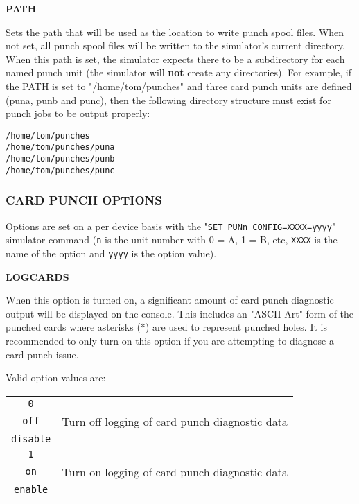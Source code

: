 \textbf{PATH}

\begin{adjustwidth}{5ex}{1ex}
    Sets the path that will be used as the location to write punch spool files. When not set, all punch spool files will be written
    to the simulator's current directory. When this path is set, the simulator expects there to be a subdirectory for each named punch 
    unit (the simulator will \textbf{not} create any directories).  For example, if the PATH is set to "/home/tom/punches" and three
    card punch units are defined (puna, punb and punc), then the following directory structure must exist for punch jobs to be output properly:

    \begin{adjustwidth}{5ex}{1ex}
        \texttt{/home/tom/punches} \\
        \texttt{/home/tom/punches/puna} \\
        \texttt{/home/tom/punches/punb} \\
        \texttt{/home/tom/punches/punc} \\
    \end{adjustwidth}
\end{adjustwidth}

\subsubsection[Card Punch Options]{CARD PUNCH OPTIONS}

Options are set on a per device basis with the "\texttt{SET PUNn CONFIG=XXXX=yyyy}" simulator command (\texttt{n} is the unit number with 0 = A, 1 = B, etc,
\texttt{XXXX} is the name of the option and \texttt{yyyy} is the option value).

\textbf{LOGCARDS}

\begin{adjustwidth}{5ex}{1ex}
    When this option is turned on, a significant amount of card punch diagnostic output will be displayed on the console. This includes
    an "ASCII Art" form of the punched cards where asterisks (*) are used to represent punched holes. It is recommended to only turn on
    this option if you are attempting to diagnose a card punch issue.

    Valid option values are:

    \begin{adjustwidth}{5ex}{1ex}
        \begin{tabular}{cc}
            \hline
            \texttt{0}  & \\
            \texttt{off} & Turn off logging of card punch diagnostic data \\ 
            \texttt{disable} & \\
            \hline
            \texttt{1} & \\
            \texttt{on} & Turn on logging of card punch diagnostic data \\ 
            \texttt{enable} & \\
            \hline
        \end{tabular}
    \end{adjustwidth}
\end{adjustwidth}

